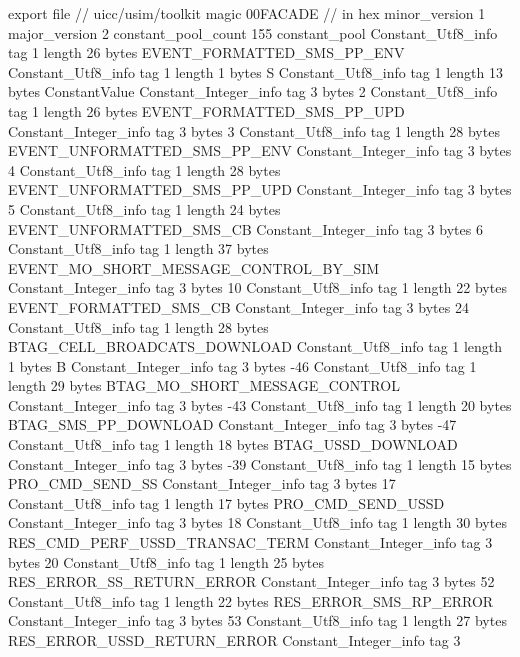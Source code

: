 export file {		// uicc/usim/toolkit
	magic	00FACADE		 // in hex
	minor_version	1
	major_version	2
	constant_pool_count	155
	constant_pool {
		Constant_Utf8_info {
			tag	1
			length	26
			bytes	EVENT_FORMATTED_SMS_PP_ENV
		}
		Constant_Utf8_info {
			tag	1
			length	1
			bytes	S
		}
		Constant_Utf8_info {
			tag	1
			length	13
			bytes	ConstantValue
		}
		Constant_Integer_info {
			tag	3
			bytes	2
		}
		Constant_Utf8_info {
			tag	1
			length	26
			bytes	EVENT_FORMATTED_SMS_PP_UPD
		}
		Constant_Integer_info {
			tag	3
			bytes	3
		}
		Constant_Utf8_info {
			tag	1
			length	28
			bytes	EVENT_UNFORMATTED_SMS_PP_ENV
		}
		Constant_Integer_info {
			tag	3
			bytes	4
		}
		Constant_Utf8_info {
			tag	1
			length	28
			bytes	EVENT_UNFORMATTED_SMS_PP_UPD
		}
		Constant_Integer_info {
			tag	3
			bytes	5
		}
		Constant_Utf8_info {
			tag	1
			length	24
			bytes	EVENT_UNFORMATTED_SMS_CB
		}
		Constant_Integer_info {
			tag	3
			bytes	6
		}
		Constant_Utf8_info {
			tag	1
			length	37
			bytes	EVENT_MO_SHORT_MESSAGE_CONTROL_BY_SIM
		}
		Constant_Integer_info {
			tag	3
			bytes	10
		}
		Constant_Utf8_info {
			tag	1
			length	22
			bytes	EVENT_FORMATTED_SMS_CB
		}
		Constant_Integer_info {
			tag	3
			bytes	24
		}
		Constant_Utf8_info {
			tag	1
			length	28
			bytes	BTAG_CELL_BROADCATS_DOWNLOAD
		}
		Constant_Utf8_info {
			tag	1
			length	1
			bytes	B
		}
		Constant_Integer_info {
			tag	3
			bytes	-46
		}
		Constant_Utf8_info {
			tag	1
			length	29
			bytes	BTAG_MO_SHORT_MESSAGE_CONTROL
		}
		Constant_Integer_info {
			tag	3
			bytes	-43
		}
		Constant_Utf8_info {
			tag	1
			length	20
			bytes	BTAG_SMS_PP_DOWNLOAD
		}
		Constant_Integer_info {
			tag	3
			bytes	-47
		}
		Constant_Utf8_info {
			tag	1
			length	18
			bytes	BTAG_USSD_DOWNLOAD
		}
		Constant_Integer_info {
			tag	3
			bytes	-39
		}
		Constant_Utf8_info {
			tag	1
			length	15
			bytes	PRO_CMD_SEND_SS
		}
		Constant_Integer_info {
			tag	3
			bytes	17
		}
		Constant_Utf8_info {
			tag	1
			length	17
			bytes	PRO_CMD_SEND_USSD
		}
		Constant_Integer_info {
			tag	3
			bytes	18
		}
		Constant_Utf8_info {
			tag	1
			length	30
			bytes	RES_CMD_PERF_USSD_TRANSAC_TERM
		}
		Constant_Integer_info {
			tag	3
			bytes	20
		}
		Constant_Utf8_info {
			tag	1
			length	25
			bytes	RES_ERROR_SS_RETURN_ERROR
		}
		Constant_Integer_info {
			tag	3
			bytes	52
		}
		Constant_Utf8_info {
			tag	1
			length	22
			bytes	RES_ERROR_SMS_RP_ERROR
		}
		Constant_Integer_info {
			tag	3
			bytes	53
		}
		Constant_Utf8_info {
			tag	1
			length	27
			bytes	RES_ERROR_USSD_RETURN_ERROR
		}
		Constant_Integer_info {
			tag	3
}}}

